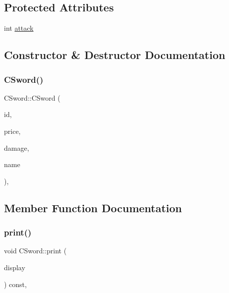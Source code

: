 \subsection*{Protected Attributes}
\begin{DoxyCompactItemize}
\item 
int \mbox{\hyperlink{class_c_sword_aba621bda5f596d0d586f2cb4b5849dee}{attack}}
\end{DoxyCompactItemize}


\subsection{Constructor \& Destructor Documentation}
\mbox{\label{class_c_sword_a7947908b12f450ca3d15143345bda422}} 
\subsubsection{\texorpdfstring{C\+Sword()}{CSword()}}
{\footnotesize\ttfamily C\+Sword\+::\+C\+Sword (\begin{DoxyParamCaption}\item[{int}]{id,  }\item[{int}]{price,  }\item[{int}]{damage,  }\item[{std\+::string}]{name }\end{DoxyParamCaption})\hspace{0.3cm}{\ttfamily [inline]}, {\ttfamily [explicit]}}



\subsection{Member Function Documentation}
\mbox{\label{class_c_sword_a8d8f4502742e5905d2be1f4d0157b6be}} 
\subsubsection{\texorpdfstring{print()}{print()}}
{\footnotesize\ttfamily void C\+Sword\+::print (\begin{DoxyParamCaption}\item[{const \mbox{\hyperlink{class_c_display}{C\+Display}} \&}]{display }\end{DoxyParamCaption}) const\hspace{0.3cm}{\ttfamily [override]}, {\ttfamily [virtual]}}



